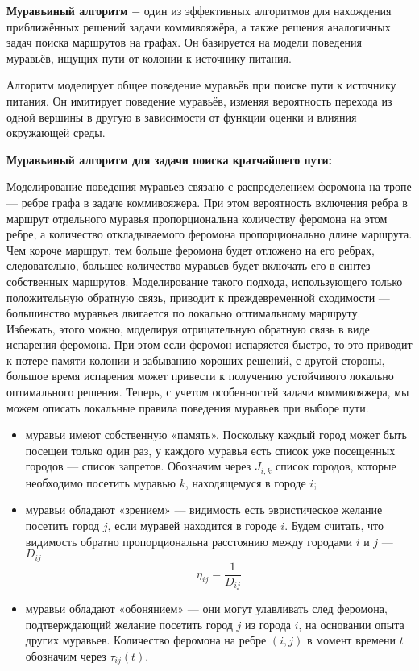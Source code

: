 \textbf{Муравьиный алгоритм} $-$ один из эффективных алгоритмов для нахождения приближённых решений задачи коммивояжёра, а также решения аналогичных задач поиска маршрутов на графах. Он базируется на модели поведения муравьёв, ищущих пути от колонии к источнику питания.

Алгоритм моделирует общее поведение муравьёв при поиске пути к источнику питания. Он имитирует поведение муравьёв, изменяя вероятность перехода из одной вершины в другую в зависимости от функции оценки и влияния окружающей среды.

\textbf{Муравьиный алгоритм для задачи поиска кратчайшего пути:}

Моделирование поведения муравьев связано с распределением феромона на тропе — ребре графа в задаче коммивояжера. При этом вероятность включения ребра в маршрут отдельного муравья пропорциональна количеству феромона на этом ребре, а количество откладываемого феромона пропорционально длине маршрута. Чем короче маршрут, тем больше феромона будет отложено на его ребрах, следовательно, большее количество муравьев будет включать его в синтез собственных маршрутов. Моделирование такого подхода, использующего только положительную обратную связь, приводит к преждевременной сходимости — большинство муравьев двигается по локально оптимальному маршруту. Избежать, этого можно, моделируя отрицательную обратную связь в виде испарения феромона. При этом если феромон испаряется быстро, то это приводит к потере памяти колонии и забыванию хороших решений, с другой стороны, большое время испарения может привести к получению устойчивого локально оптимального решения. Теперь, с учетом особенностей задачи коммивояжера, мы можем описать локальные правила поведения муравьев при выборе пути.

\begin{itemize}
	\item муравьи имеют собственную «память». Поскольку каждый город может быть посещеи только один раз, у каждого муравья есть список уже посещенных городов --- список запретов. Обозначим через $J_{i,k}$ список городов, которые необходимо посетить муравью $k$, находящемуся в городе $i$;
	\item муравьи обладают «зрением» --- видимость есть эвристическое желание посетить город $j$, если муравей находится в городе $i$. Будем считать, что видимость обратно пропорциональна расстоянию между городами $i$ и $j$ --- $D_{ij}$ 
	\begin{equation}
	\label{eq:vision}
	\eta_{ij} = \frac{1}{D_{ij}}
	\end{equation}
	\item муравьи обладают «обонянием» — они могут улавливать след феромона, подтверждающий желание посетить город $j$ из города $i$, на основании опыта других муравьев. Количество феромона на ребре $(i,j)$ в момент времени $t$ обозначим через $\tau_{ij}(t)$.
\end{itemize}

